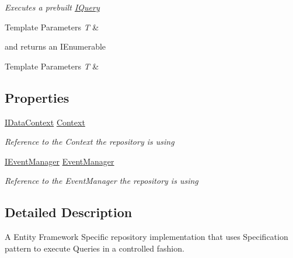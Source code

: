 \begin{DoxyCompactItemize}
\begin{DoxyCompactList}\small\item\em Executes a prebuilt \hyperlink{class_i_query-g}{I\-Query}
\begin{DoxyTemplParams}{Template Parameters}
{\em T} & \\
\hline
\end{DoxyTemplParams}
and returns an I\-Enumerable
\begin{DoxyTemplParams}{Template Parameters}
{\em T} & \\
\hline
\end{DoxyTemplParams}
\end{DoxyCompactList}\end{DoxyCompactItemize}
\subsection*{Properties}
\begin{DoxyCompactItemize}
\item 
\hyperlink{interface_highway_1_1_data_1_1_interfaces_1_1_i_data_context}{I\-Data\-Context} \hyperlink{class_highway_1_1_data_1_1_entity_framework_1_1_repositories_1_1_entity_framework_repository_a39447e7deb1284fc5e5d9ea7c2c78c63}{Context}
\begin{DoxyCompactList}\small\item\em Reference to the Context the repository is using \end{DoxyCompactList}\item 
\hyperlink{interface_highway_1_1_data_1_1_interfaces_1_1_i_event_manager}{I\-Event\-Manager} \hyperlink{class_highway_1_1_data_1_1_entity_framework_1_1_repositories_1_1_entity_framework_repository_abb629b7ba44c32a78951f64554f52e06}{Event\-Manager}
\begin{DoxyCompactList}\small\item\em Reference to the Event\-Manager the repository is using \end{DoxyCompactList}\end{DoxyCompactItemize}


\subsection{Detailed Description}
A Entity Framework Specific repository implementation that uses Specification pattern to execute Queries in a controlled fashion. 



